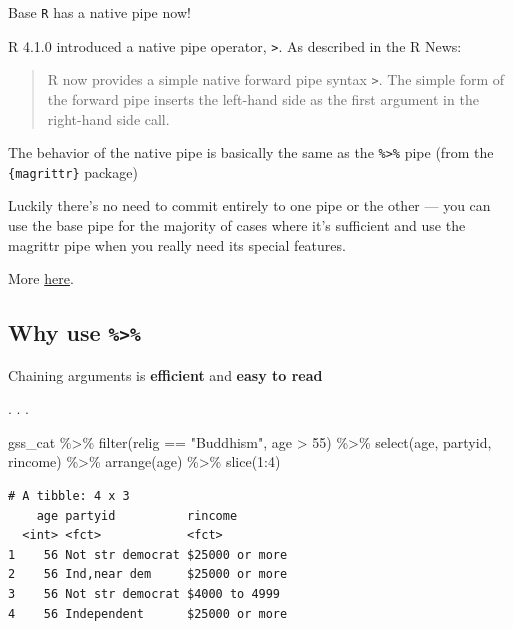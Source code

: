 \documentclass[
  letterpaper,
  DIV=11,
  numbers=noendperiod,
  oneside]{scrartcl}
\newenvironment{Shaded}{\begin{snugshade}}{\end{snugshade}}
\newcommand{\DecValTok}[1]{\textcolor[rgb]{0.68,0.00,0.00}{#1}}
\newcommand{\FunctionTok}[1]{\textcolor[rgb]{0.28,0.35,0.67}{#1}}
\newcommand{\NormalTok}[1]{\textcolor[rgb]{0.00,0.23,0.31}{#1}}
\newcommand{\SpecialCharTok}[1]{\textcolor[rgb]{0.37,0.37,0.37}{#1}}
\newcommand{\StringTok}[1]{\textcolor[rgb]{0.13,0.47,0.30}{#1}}
\begin{document}
Base \texttt{R} has a native pipe now!

R 4.1.0 introduced a native pipe operator,
\texttt{\textbar{}\textgreater{}}. As described in the R News:

\begin{quote}
R now provides a simple native forward pipe syntax
\texttt{\textbar{}\textgreater{}}. The simple form of the forward pipe
inserts the left-hand side as the first argument in the right-hand side
call.
\end{quote}

The behavior of the native pipe is basically the same as the
\texttt{\%\textgreater{}\%} pipe (from the \texttt{\{magrittr\}}
package)

Luckily there's no need to commit entirely to one pipe or the other ---
you can use the base pipe for the majority of cases where it's
sufficient and use the magrittr pipe when you really need its special
features.

More
\href{https://www.tidyverse.org/blog/2023/04/base-vs-magrittr-pipe/\#-vs}{here}.

\hypertarget{why-use}{%
\subsection{\texorpdfstring{Why use
\texttt{\%\textgreater{}\%}}{Why use \%\textgreater\%}}\label{why-use}}

Chaining arguments is \textbf{efficient} and \textbf{easy to read}

. . .

\begin{Shaded}
\begin{Highlighting}[]
\NormalTok{gss\_cat }\SpecialCharTok{\%\textgreater{}\%} 
  \FunctionTok{filter}\NormalTok{(relig }\SpecialCharTok{==} \StringTok{"Buddhism"}\NormalTok{,}
\NormalTok{         age }\SpecialCharTok{\textgreater{}} \DecValTok{55}\NormalTok{) }\SpecialCharTok{\%\textgreater{}\%} 
  \FunctionTok{select}\NormalTok{(age, partyid, rincome) }\SpecialCharTok{\%\textgreater{}\%} 
  \FunctionTok{arrange}\NormalTok{(age) }\SpecialCharTok{\%\textgreater{}\%} 
  \FunctionTok{slice}\NormalTok{(}\DecValTok{1}\SpecialCharTok{:}\DecValTok{4}\NormalTok{)}
\end{Highlighting}
\end{Shaded}

\begin{verbatim}
# A tibble: 4 x 3
    age partyid          rincome       
  <int> <fct>            <fct>         
1    56 Not str democrat $25000 or more
2    56 Ind,near dem     $25000 or more
3    56 Not str democrat $4000 to 4999 
4    56 Independent      $25000 or more
\end{verbatim}
\end{document}
